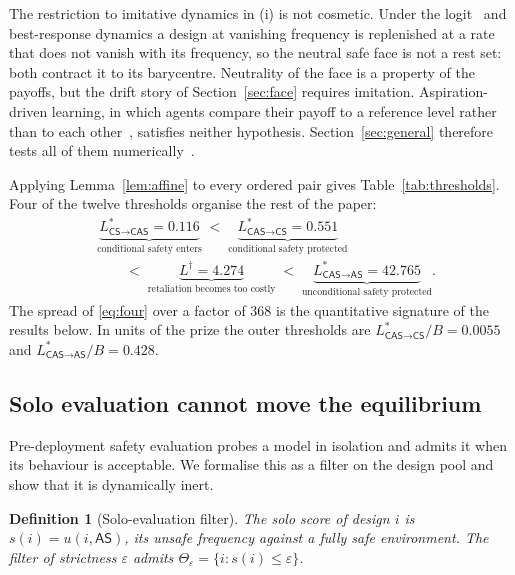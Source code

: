 \documentclass[pdflatex]{sn-jnl}
\theoremstyle{thmstyleone}
\theoremstyle{thmstylethree}
\newtheorem{definition}[theorem]{Definition}
\theoremstyle{thmstyletwo}
\newcommand{\AS}{\textsf{AS}}
\newcommand{\CS}{\textsf{CS}}
\newcommand{\CAS}{\textsf{CAS}}
\begin{document}
The restriction to imitative dynamics in (i) is not cosmetic. Under the
logit~\citep{blume1993statistical} and best-response dynamics a design at
vanishing frequency is replenished at a
rate that does not vanish with its frequency, so the neutral safe face is not
a rest set: both contract it to its barycentre. Neutrality of the face is a
property of the payoffs, but the drift story of Section~\ref{sec:face}
requires imitation. Aspiration-driven learning, in which agents compare their
payoff to a reference level rather than to each other~\citep{posch1999aspiration}, satisfies neither hypothesis.
Section~\ref{sec:general} therefore tests all of
them numerically~\citep{sandholm2010population}.

Applying Lemma~\ref{lem:affine} to every ordered pair gives
Table~\ref{tab:thresholds}. Four of the twelve thresholds organise the rest of
the paper:
\begin{equation}
\begin{aligned}
&\underbrace{L^{*}_{\CS\to\CAS}=0.116}_{\text{conditional safety enters}}
\;<\;\underbrace{L^{*}_{\CAS\to\CS}=0.551}_{\text{conditional safety protected}}\\[2pt]
&\qquad<\;\underbrace{L^{\dagger}=4.274}_{\text{retaliation becomes too costly}}
\;<\;\underbrace{L^{*}_{\CAS\to\AS}=42.765}_{\text{unconditional safety protected}} .
\end{aligned}
\label{eq:four}
\end{equation}
The spread of \eqref{eq:four} over a factor of $368$ is the quantitative
signature of the results below. In units of the prize the outer thresholds are
$L^{*}_{\CAS\to\CS}/B=0.0055$ and $L^{*}_{\CAS\to\AS}/B=0.428$.

\subsection{Solo evaluation cannot move the equilibrium}\label{sec:filter}

Pre-deployment safety evaluation probes a model in isolation and admits it
when its behaviour is acceptable. We formalise this as a filter on the design
pool and show that it is dynamically inert.

\begin{definition}[Solo-evaluation filter]
The solo score of design $i$ is $s(i)=u(i,\AS)$, its unsafe frequency against
a fully safe environment. The filter of strictness $\varepsilon$ admits
$\Theta_{\varepsilon}=\{i: s(i)\le\varepsilon\}$.
\end{definition}
\end{document}
